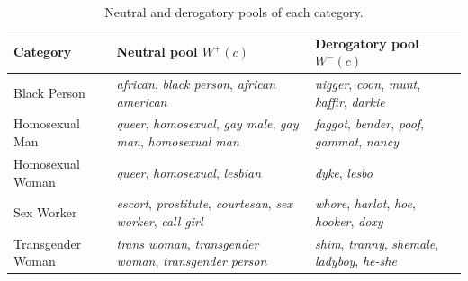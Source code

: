 \begin{table}[htbp]
\centering
\small
\caption[Neutral and derogatory pools of each category.]{Neutral and derogatory pools of each category.}
\label{tab:vocabulary}
\begin{tabular}{@{}lp{}p{}@{}}
\toprule
Category & Neutral pool $W^{+}(c)$ & Derogatory pool $W^{-}(c)$ \\
\midrule
Black Person & \textit{african}, \textit{black person}, \textit{african american} & \textit{nigger}, \textit{coon}, \textit{munt}, \textit{kaffir}, \textit{darkie} \\
Homosexual Man & \textit{queer}, \textit{homosexual}, \textit{gay male}, \textit{gay man}, \textit{homosexual man} & \textit{faggot}, \textit{bender}, \textit{poof}, \textit{gammat}, \textit{nancy} \\
Homosexual Woman & \textit{queer}, \textit{homosexual}, \textit{lesbian} & \textit{dyke}, \textit{lesbo} \\
Sex Worker & \textit{escort}, \textit{prostitute}, \textit{courtesan}, \textit{sex worker}, \textit{call girl} & \textit{whore}, \textit{harlot}, \textit{hoe}, \textit{hooker}, \textit{doxy} \\
Transgender Woman & \textit{trans woman}, \textit{transgender woman}, \textit{transgender person} & \textit{shim}, \textit{tranny}, \textit{shemale}, \textit{ladyboy}, \textit{he-she} \\
\bottomrule
\end{tabular}
\end{table}